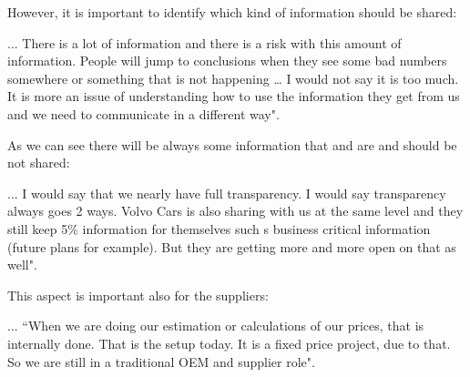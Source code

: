 However, it is important to identify which kind of information should be shared:

\begin{aquote}{...}
There is a lot of information and there is a risk with this amount of information. People will jump to conclusions when they see some bad numbers somewhere or something that is not happening … I would not say it is too much. It is more an issue of understanding how to use the information they get from us and we need to communicate in a different way".
\end{aquote}

As we can see there will be always some information that and are and should be not shared:

\begin{aquote}{...}
I would say that we nearly have full transparency. I would say transparency always goes 2 ways. Volvo Cars is also sharing with us at the same level and they still keep 5\% information for themselves such s business critical information (future plans for example). But they are getting more and more open on that as well".
\end{aquote}

This aspect is important also for the suppliers:

\begin{aquote}{...}
``When we are doing our estimation or calculations of our prices, that is internally done. That is the setup today. It is a fixed price project, due to that. So we are still in a traditional OEM and supplier role".
\end{aquote}

%
% 
%
%
%

